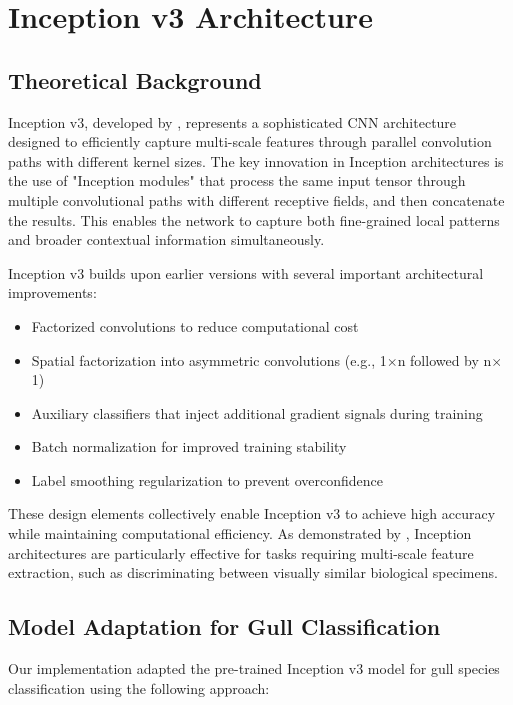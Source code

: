 \section{Inception v3 Architecture}

\subsection{Theoretical Background}

Inception v3, developed by \citep{szegedy2016rethinking}, represents a sophisticated CNN architecture designed to efficiently capture multi-scale features through parallel convolution paths with different kernel sizes. The key innovation in Inception architectures is the use of "Inception modules" that process the same input tensor through multiple convolutional paths with different receptive fields, and then concatenate the results. This enables the network to capture both fine-grained local patterns and broader contextual information simultaneously.

Inception v3 builds upon earlier versions with several important architectural improvements:

\begin{itemize}
    \item Factorized convolutions to reduce computational cost
    \item Spatial factorization into asymmetric convolutions (e.g., 1$\times$n followed by n$\times$1)
    \item Auxiliary classifiers that inject additional gradient signals during training
    \item Batch normalization for improved training stability
    \item Label smoothing regularization to prevent overconfidence
\end{itemize}

These design elements collectively enable Inception v3 to achieve high accuracy while maintaining computational efficiency. As demonstrated by \citep{shu2023multiscale}, Inception architectures are particularly effective for tasks requiring multi-scale feature extraction, such as discriminating between visually similar biological specimens.

\subsection{Model Adaptation for Gull Classification}

Our implementation adapted the pre-trained Inception v3 model for gull species classification using the following approach:

